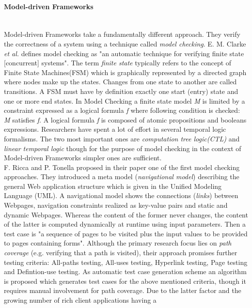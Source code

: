 \documentclass[12pt, notitlepage]{article}
\begin{document}
\paragraph{Model-driven Frameworks} ~\\
Model-driven Frameworks take a fundamentally different approach. They verify the correctness of a system using a technique called \textit{model checking}.
E. M. Clarke \textit{et al.}\cite{model-checking} defines model checking as "an automatic technique for verifying finite state [concurrent] systems".
The term \textit{finite state} typically refers to the concept of Finite State Machines(FSM)\cite{finite-state-machines} which is graphically represented by a directed graph where nodes make up the states. Changes from one state to another are called transitions. A FSM must have by definition exactly one start (entry) state and one or more end states.  In Model Checking a finite state model \textit{M} is limited by a constraint expressed as a logical formula \textit{f} where
following condition is checked: \textit{M} satisfies \textit{f}. A logical formula \textit{f} is composed of atomic propositions and booleans
expressions\cite{model-checking}. Researchers have spent a lot of effort in several temporal logic formalisms. The two most important ones are
\textit{computation tree logic(CTL)} and \textit{linear temporal logic} though for the purpose of model checking in the context of Model-driven Frameworks simpler
ones are sufficient\cite{dynamic-testing-web-applications}. \\
F. Ricca and P. Tonella proposed in their paper\cite{web-whiteBox-testing} one of the first model checking approaches. They introduced a
meta model (\textit{navigational model}) describing the general Web application structure which is given in the Unified Modeling Language (UML)\cite{uml}.
A navigational model shows the connections (\textit{links}) between Webpages, navigation constraints realized as key-value pairs and static and dynamic Webpages. 
Whereas the content of the former never changes, the content of the latter is computed dynamically at runtime using input parameters. Then a test case is
"a sequence of pages to be visited plus the input values to be provided to pages containing forms"\cite{web-whiteBox-testing}. Although the primary research focus
lies on \textit{path coverage} (e.g. verifying that a path is visited), their approach promises further testing criteria: All-paths testing, All-uses testing,
Hyperlink testing, Page testing and Defintion-use testing. As automatic test case generation scheme an algorithm is proposed which generates test cases for the above mentioned criteria, though it requires manual involvement for path coverage. Due to the latter factor and the growing number of rich client applications having a
\end{document}
